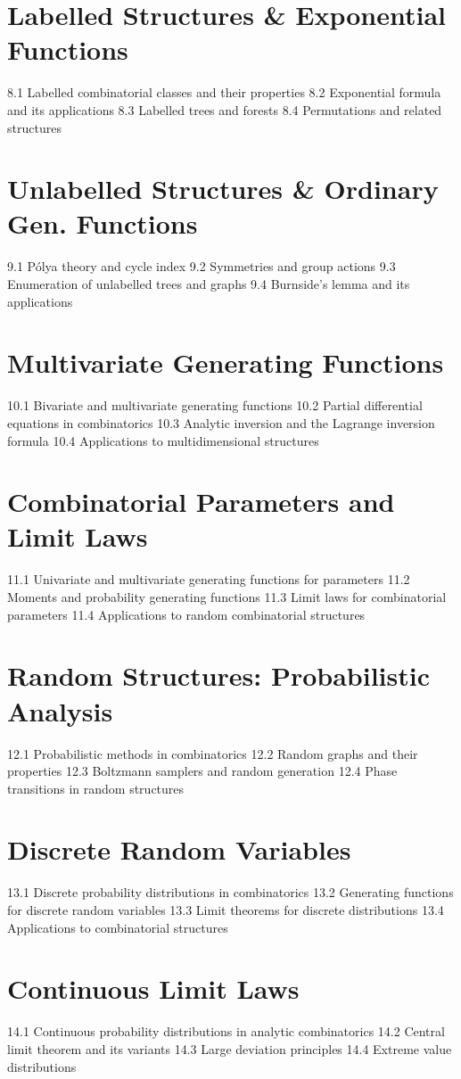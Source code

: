 \section{Labelled Structures \& Exponential Functions}
8.1 Labelled combinatorial classes and their properties
8.2 Exponential formula and its applications
8.3 Labelled trees and forests
8.4 Permutations and related structures
\section{Unlabelled Structures \& Ordinary Gen. Functions}
9.1 Pólya theory and cycle index
9.2 Symmetries and group actions
9.3 Enumeration of unlabelled trees and graphs
9.4 Burnside's lemma and its applications
\section{Multivariate Generating Functions}
10.1 Bivariate and multivariate generating functions
10.2 Partial differential equations in combinatorics
10.3 Analytic inversion and the Lagrange inversion formula
10.4 Applications to multidimensional structures
\section{Combinatorial Parameters and Limit Laws}
11.1 Univariate and multivariate generating functions for parameters
11.2 Moments and probability generating functions
11.3 Limit laws for combinatorial parameters
11.4 Applications to random combinatorial structures
\section{Random Structures: Probabilistic Analysis}
12.1 Probabilistic methods in combinatorics
12.2 Random graphs and their properties
12.3 Boltzmann samplers and random generation
12.4 Phase transitions in random structures
\section{Discrete Random Variables}
13.1 Discrete probability distributions in combinatorics
13.2 Generating functions for discrete random variables
13.3 Limit theorems for discrete distributions
13.4 Applications to combinatorial structures
\section{Continuous Limit Laws}
14.1 Continuous probability distributions in analytic combinatorics
14.2 Central limit theorem and its variants
14.3 Large deviation principles
14.4 Extreme value distributions
